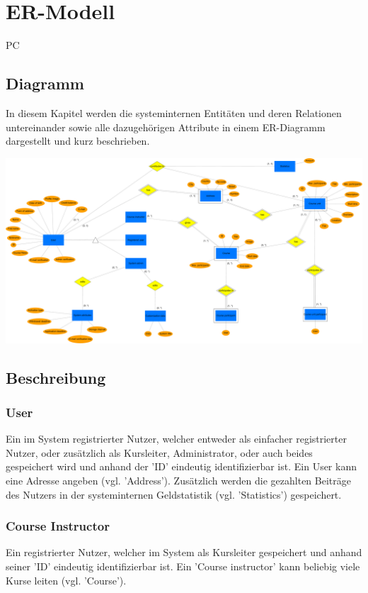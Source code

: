 \chapter{ER-Modell}

\begin{tiny}
PC
\end{tiny}

\section{Diagramm}

In diesem Kapitel werden die systeminternen Entitäten und deren Relationen untereinander sowie alle dazugehörigen Attribute in einem ER-Diagramm dargestellt und kurz beschrieben.

\includegraphics[scale=0.085]{./Grafiken/ER-Diagramm.pdf}

\section{Beschreibung}
\subsection{User}
Ein im System registrierter Nutzer, welcher entweder als einfacher registrierter Nutzer, oder zusätzlich als Kursleiter, Administrator, oder auch beides gespeichert wird und anhand der 'ID' eindeutig identifizierbar ist. Ein User kann eine Adresse angeben (vgl. 'Address'). Zusätzlich werden die gezahlten Beiträge des Nutzers in der systeminternen Geldstatistik (vgl. 'Statistics') gespeichert.

\subsection{Course Instructor}
Ein registrierter Nutzer, welcher im System als Kursleiter gespeichert und anhand seiner 'ID' eindeutig identifizierbar ist. Ein 'Course instructor' kann beliebig viele Kurse leiten (vgl. 'Course').

